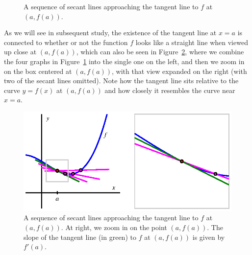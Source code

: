 \begin{figure}[h]
\begin{center}
\end{center}
\caption{A sequence of secant lines approaching the tangent line to $f$ at $(a,f(a))$.} \label{F:1.3.SeqToTanSeq}
\end{figure}

As we will see in subsequent study, the existence of the tangent line at $x = a$ is connected to whether or not the function $f$ looks like a straight line when viewed up close at $(a,f(a))$, which can also be seen in Figure~\ref{F:1.3.SeqToTan}, where we combine the four graphs in Figure~\ref{F:1.3.SeqToTanSeq} into the single one on the left, and then we zoom in on the box centered at $(a,f(a))$, with that view expanded on the right (with two of the secant lines omitted).  Note how the tangent line sits relative to the curve $y = f(x)$ at $(a,f(a))$ and how closely it resembles the curve near $x = a$.

\begin{figure}[h]
\begin{center}
\includegraphics{figures/1_3_SecToTan.eps}
\end{center}
\caption{A sequence of secant lines approaching the tangent line to $f$ at $(a,f(a))$.  At right, we zoom in on the point $(a,f(a))$.  The slope of the tangent line (in green) to $f$ at $(a,f(a))$ is given by $f'(a)$.} \label{F:1.3.SeqToTan}
\end{figure}

